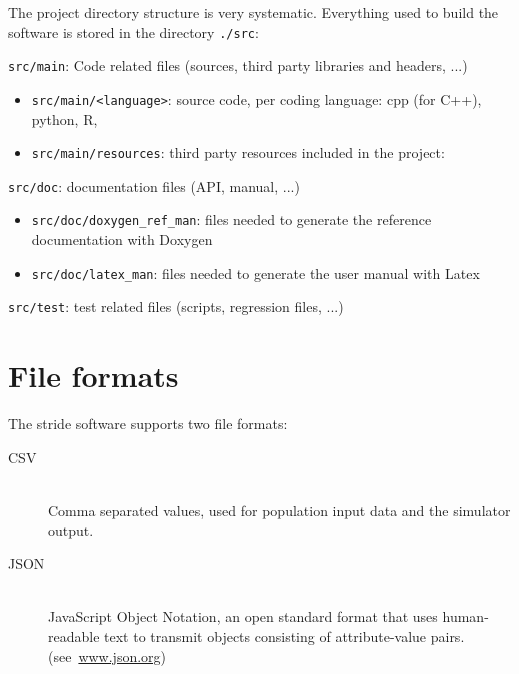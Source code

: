 The project directory structure is very systematic.
Everything used to build the software is stored in the directory \texttt{./src}:
\begin{compactitem}
    \item \texttt{src/main}: Code related files (sources, third party libraries and headers, ...)
      	\begin{itemize}
        		\item \texttt{src/main/<language>}: source code, per coding language: cpp (for C++), python, R,   
        		\item \texttt{src/main/resources}: third party resources included in the project: 
        \end{itemize}
    \item \texttt{src/doc}: documentation files (API, manual, ...)
      	\begin{itemize}
        		\item \texttt{src/doc/doxygen\_ref\_man}: files needed to generate the reference documentation with Doxygen
        		\item \texttt{src/doc/latex\_man}: files needed to generate the user manual with Latex
        \end{itemize}
    \item \texttt{src/test}: test related files (scripts, regression files, ...)
\end{compactitem}

\section{File formats}
\label{section:FileFormats}

The stride software supports two file formats: 
\begin{description}
	\item [CSV] \ \\
	Comma separated values, used for population input data and the simulator output.
	\item [JSON] \ \\
	JavaScript Object Notation, an open standard format that uses human-readable text to transmit objects consisting of attribute-value pairs. 	 \mbox{(see \url{www.json.org})}
\end{description}


%

